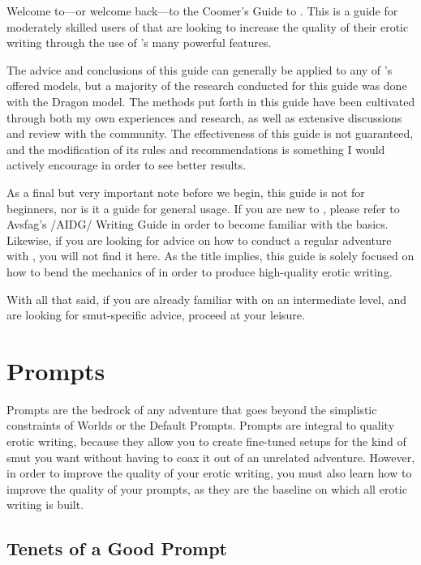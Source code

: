 ﻿\documentclass[Coomer-main.tex]{subfiles}
\begin{document}
\label{ch:preface}

Welcome to—or welcome back—to the Coomer's Guide to \aid.
This is a guide for moderately skilled users of \aid that are looking to increase the quality of their erotic writing through the use of \aid's many powerful features.

The advice and conclusions of this guide can generally be applied to any of \aid's offered models, but a majority of the research conducted for this guide was done with the Dragon model.
The methods put forth in this guide have been cultivated through both my own experiences and research, as well as extensive discussions and review with the \aid community.
The effectiveness of this guide is not guaranteed, and the modification of its rules and recommendations is something I would actively encourage in order to see better results.

As a final but very important note before we begin, this guide is not for beginners, nor is it a guide for general usage.
If you are new to \aid, please refer to Avsfag's /AIDG/ Writing Guide in order to become familiar with the basics.
Likewise, if you are looking for advice on how to conduct a regular adventure with \aid, you will not find it here.
As the title implies, this guide is solely focused on how to bend the mechanics of \aid in order to produce high-quality erotic writing.

With all that said, if you are already familiar with \aid on an intermediate level, and are looking for smut-specific advice, proceed at your leisure.

\chapter{Prompts}
\label{ch:prompts}

Prompts are the bedrock of any \aid adventure that goes beyond the simplistic constraints of Worlds or the Default Prompts.
Prompts are integral to quality erotic writing, because they allow you to create fine-tuned setups for the kind of smut you want without having to coax it out of an unrelated adventure.
However, in order to improve the quality of your erotic writing, you must also learn how to improve the quality of your prompts, as they are the baseline on which all erotic writing is built.

\section{Tenets of a Good Prompt}
\label{sec:tenets}
\end{document}
